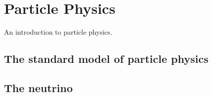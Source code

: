 \chapter{Particle Physics}
\label{chap:particle-physics}

An introduction to particle physics.


\section{The standard model of particle physics}


\section{The neutrino}


